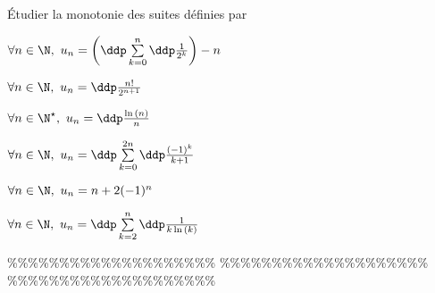 



\begin{exercice} \; \'Etudier la monotonie des suites d\'efinies par
\begin{enumerate}
\begin{minipage}[t]{0.4\textwidth}
 \item
$\forall n\in\N,\ u_n=\left(\ddp \sum\limits_{k=0}^n \ddp\frac{1}{2^k}\right)-n$ 
\item 
$\forall n\in\N,\ u_n=\ddp\frac{n!}{2^{n+1}}$ 
\item 
$\forall n\in\N^{\star},\ u_n=\ddp\frac{\ln{(n)}}{n}$ 
\end{minipage}
\begin{minipage}[t]{0.4\textwidth}
\item 
$\forall n\in\N,\ u_n=\ddp \sum\limits_{k=0}^{2n}\ddp\frac{(-1)^k}{k+1}$ 
\item 
$\forall n\in\N,\ u_n=n+2(-1)^n$ 
\item $\forall n\in\N,\ u_n=\ddp \sum\limits_{k=2}^{n}\ddp\frac{1}{k\ln{(k)}}$ 
\end{minipage}
\end{enumerate}
\end{exercice}


\%\%\%\%\%\%\%\%\%\%\%\%\%\%\%\%\%\%\%\%
\%\%\%\%\%\%\%\%\%\%\%\%\%\%\%\%\%\%\%\%
\%\%\%\%\%\%\%\%\%\%\%\%\%\%\%\%\%\%\%\%




